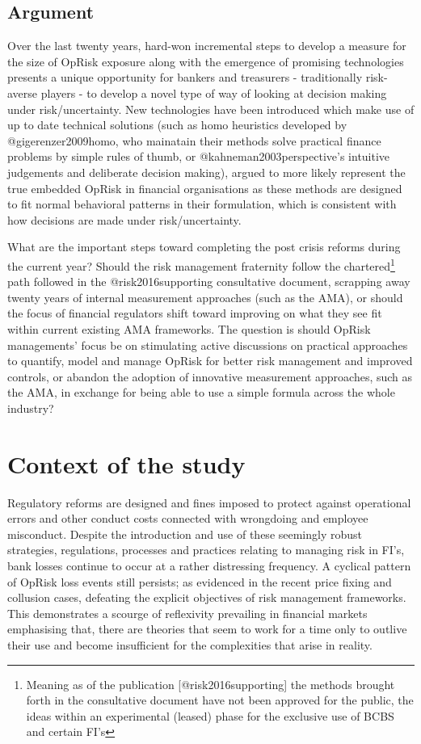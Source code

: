 \documentclass[]{article}
\let\rmarkdownfootnote\footnote%
\def\footnote{\protect\rmarkdownfootnote}
\begin{document}
\subsection{Argument}
\label{ssec:Argument}

Over the last twenty years, hard-won incremental steps to develop a
measure for the size of OpRisk exposure along with the emergence of
promising technologies presents a unique opportunity for bankers and
treasurers - traditionally risk-averse players - to develop a novel type
of way of looking at decision making under risk/uncertainty. New
technologies have been introduced which make use of up to date technical
solutions (such as homo heuristics developed by @gigerenzer2009homo, who
mainatain their methods solve practical finance problems by simple rules
of thumb, or @kahneman2003perspective's intuitive judgements and
deliberate decision making), argued to more likely represent the true
embedded OpRisk in financial organisations as these methods are designed
to fit normal behavioral patterns in their formulation, which is
consistent with how decisions are made under risk/uncertainty.\medskip 

What are the important steps toward completing the post crisis reforms
during the current year? Should the risk management fraternity follow
the
chartered\footnote{Meaning as of the publication [@risk2016supporting] the methods brought forth in the consultative document have not been approved for the public, the ideas within an experimental (leased) phase for the exclusive use of BCBS and certain FI's}
path followed in the @risk2016supporting consultative document,
scrapping away twenty years of internal measurement approaches (such as
the AMA), or should the focus of financial regulators shift toward
improving on what they see fit within current existing AMA frameworks.
The question is should OpRisk managements' focus be on stimulating
active discussions on practical approaches to quantify, model and manage
OpRisk for better risk management and improved controls, or abandon the
adoption of innovative measurement approaches, such as the AMA, in
exchange for being able to use a simple formula across the whole
industry?

\section{Context of the study}
\label{sec:Context of the study}

Regulatory reforms are designed and fines imposed to protect against
operational errors and other conduct costs connected with wrongdoing and
employee misconduct. Despite the introduction and use of these seemingly
robust strategies, regulations, processes and practices relating to
managing risk in FI's, bank losses continue to occur at a rather
distressing frequency. A cyclical pattern of OpRisk loss events still
persists; as evidenced in the recent price fixing and collusion cases,
defeating the explicit objectives of risk management frameworks. This
demonstrates a scourge of reflexivity prevailing in financial markets
emphasising that, there are theories that seem to work for a time only
to outlive their use and become insufficient for the complexities that
arise in reality.
\end{document}
